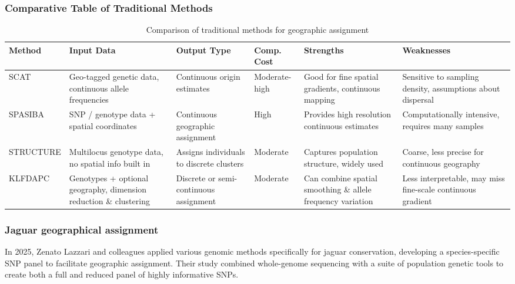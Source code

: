 \subsubsection{Comparative Table of Traditional Methods}

\begin{table}[H]
\centering
\caption{Comparison of traditional methods for geographic assignment}
\label{tab:traditional_methods}
\small
\begin{tabular}{p{1.8cm}p{2.3cm}p{2cm}p{1.5cm}p{2.5cm}p{2.5cm}}
\hline
\textbf{Method} & \textbf{Input Data} & \textbf{Output Type} & \textbf{Comp. Cost} & \textbf{Strengths} & \textbf{Weaknesses} \\
\hline
SCAT & Geo-tagged genetic data, continuous allele frequencies & Continuous origin estimates & Moderate-high & Good for fine spatial gradients, continuous mapping & Sensitive to sampling density, assumptions about dispersal \\
\hline
SPASIBA & SNP / genotype data + spatial coordinates & Continuous geographic assignment & High & Provides high resolution continuous estimates & Computationally intensive, requires many samples \\
\hline
STRUCTURE & Multilocus genotype data, no spatial info built in & Assigns individuals to discrete clusters & Moderate & Captures population structure, widely used & Coarse, less precise for continuous geography \\
\hline
KLFDAPC & Genotypes + optional geography, dimension reduction \& clustering & Discrete or semi-continuous assignment & Moderate & Can combine spatial smoothing \& allele frequency variation & Less interpretable, may miss fine-scale continuous gradient \\
\hline
\end{tabular}
\end{table}

\subsubsection{Jaguar geographical assignment}

In 2025, Zenato Lazzari and colleagues \cite{lazzari2025development} applied various genomic methods specifically for jaguar conservation, developing a species-specific SNP panel to facilitate geographic assignment. Their study combined whole-genome sequencing with a suite of population genetic tools to create both a full and reduced panel of highly informative SNPs.

